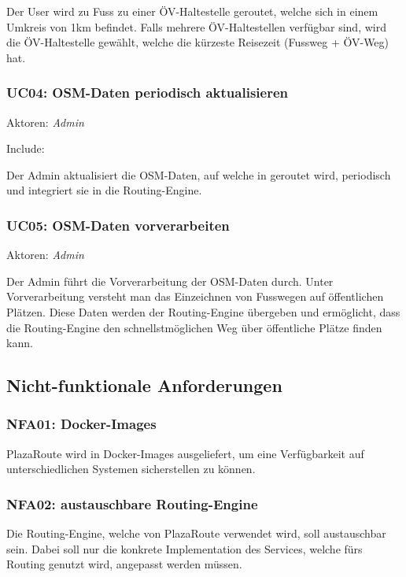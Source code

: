 Der User wird zu Fuss zu einer ÖV-Haltestelle geroutet, welche sich in einem Umkreis von 1km befindet. Falls mehrere ÖV-Haltestellen verfügbar sind, wird die ÖV-Haltestelle gewählt, welche die kürzeste Reisezeit (Fussweg + ÖV-Weg) hat.

\subsubsection{UC04: OSM-Daten periodisch aktualisieren}
\label{usecase:UC04}
Aktoren: \emph{Admin}

Include: 

Der Admin aktualisiert die \ac{OSM}-Daten, auf welche in  geroutet wird, periodisch und integriert sie in die Routing-Engine.

\subsubsection{UC05: OSM-Daten vorverarbeiten}
\label{usecase:UC05}
Aktoren: \emph{Admin}

Der Admin führt die Vorverarbeitung der \ac{OSM}-Daten durch. Unter Vorverarbeitung versteht man das Einzeichnen von Fusswegen auf öffentlichen Plätzen. Diese Daten werden der Routing-Engine übergeben und ermöglicht, dass die Routing-Engine den schnellstmöglichen Weg über öffentliche Plätze finden kann.

\subsection{Nicht-funktionale Anforderungen}
\label{sub:Nicht-funktionale Anforderungen}

\subsubsection{NFA01: Docker-Images}
\label{NFA:NFA01}

PlazaRoute wird in Docker-Images ausgeliefert, um eine Verfügbarkeit auf unterschiedlichen Systemen sicherstellen zu können.

\subsubsection{NFA02: austauschbare Routing-Engine}
\label{NFA:NFA02}

Die Routing-Engine, welche von PlazaRoute verwendet wird, soll austauschbar sein. Dabei soll nur die konkrete Implementation des Services, welche fürs Routing genutzt wird, angepasst werden müssen.

